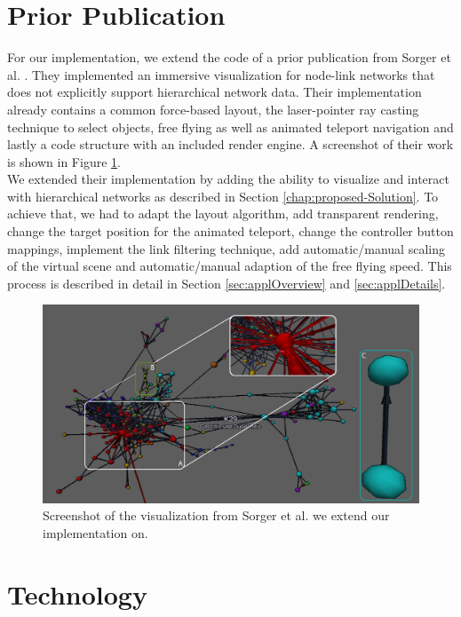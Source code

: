\section{Prior Publication}
For our implementation, we extend the code of a prior publication from Sorger et al. \cite{sorger_immersive_2019}. 
They implemented an immersive visualization for node-link networks that does not explicitly support hierarchical network data. Their implementation already contains a common force-based layout, the laser-pointer ray casting technique to select objects, free flying as well as animated teleport navigation and lastly a code structure with an included render engine. A screenshot of their work is shown in Figure \ref{fig:priorPublication}.\\
We extended their implementation by adding the ability to visualize and interact with hierarchical networks as described in Section \ref{chap:proposed-Solution}. To achieve that, we had to adapt the layout algorithm, add transparent rendering, change the target position for the animated teleport, change the controller button mappings, implement the link filtering technique, add automatic/manual scaling of the virtual scene and automatic/manual adaption of the free flying speed.
This process is described in detail in Section \ref{sec:applOverview} and \ref{sec:applDetails}.

\begin{figure}[!hbt]
    \centering
    \includegraphics[width=\textwidth]{graphics/screenshotPriorPublication.jpg}
    \caption{Screenshot of the visualization from Sorger et al. \cite{sorger_immersive_2019} we extend our implementation on.}
    \label{fig:priorPublication}
\end{figure}

\section{Technology}

